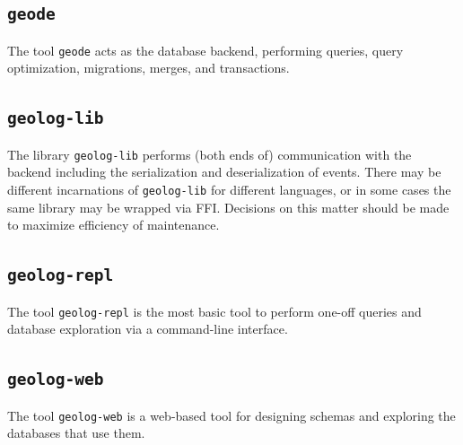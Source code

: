 \documentclass{article}
\begin{document}
\subsection{\tt geode}

The tool {\tt geode} acts as the database backend, performing queries, query optimization, migrations, merges, and transactions.

\subsection{\tt geolog-lib}

The library {\tt geolog-lib} performs (both ends of) communication with the backend including the serialization and deserialization of events.  There may be different incarnations of {\tt geolog-lib} for different languages, or in some cases the same library may be wrapped via FFI.  Decisions on this matter should be made to maximize efficiency of maintenance.

\subsection{\tt geolog-repl}

The tool {\tt geolog-repl} is the most basic tool to perform one-off queries and database exploration via a command-line interface.

\subsection{\tt geolog-web}

The tool {\tt geolog-web} is a web-based tool for designing schemas and exploring the databases that use them.



\end{document}
